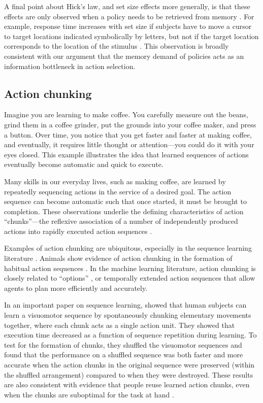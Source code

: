 \documentclass[11pt]{article}
\begin{document}
A final point about Hick's law, and set size effects more generally, is that these effects are only observed when a policy needs to be retrieved from memory \citep{proctor18}. For example, response time increases with set size if subjects have to move a cursor to target locations indicated symbolically by letters, but not if the target location corresponds to the location of the stimulus \citep{dassonville99}. This observation is broadly consistent with our argument that the memory demand of policies acts as an information bottleneck in action selection.

\subsection{Action chunking}

Imagine you are learning to make coffee. You carefully measure out the beans, grind them in a coffee grinder, put the grounds into your coffee maker, and press a button. Over time, you notice that you get faster and faster at making coffee, and eventually, it requires little thought or attention---you could do it with your eyes closed. This example illustrates the idea that learned sequences of actions eventually become automatic and quick to execute.

Many skills in our everyday lives, such as making coffee, are learned by repeatedly sequencing actions in the service of a desired goal. The action sequence can become automatic such that once started, it must be brought to completion. These observations underlie the defining characteristics of action ``chunks''---the reflexive association of a number of independently produced actions into rapidly executed action sequences \citep{dezfouli12,lashley51,sakai03,botvinick08}.

Examples of action chunking are ubiquitous, especially in the sequence learning literature \citep{Terrace1991-di,Verwey1999-fn,sakai03,Miyapuram2006-gb}. Animals show evidence of action chunking in the formation of habitual action sequences \citep{Graybiel1998-sw,jin10,jin14}. In the machine learning literature, action chunking is closely related to ``options'' \citep{Precup1998-wo,Precup2000-qa}, or temporally extended action sequences that allow agents to plan more efficiently and accurately. 

In an important paper on sequence learning, \cite{sakai03} showed that human subjects can learn a visuomotor sequence by spontaneously chunking elementary movements together, where each chunk acts as a single action unit. They showed that execution time decreased as a function of sequence repetition during learning. To test for the formation of chunks, they shuffled the visuomotor sequences and found that the performance on a shuffled sequence was both faster and more accurate when the action chunks in the original sequence were preserved (within the shuffled arrangement) compared to when they were destroyed.  These results are also consistent with evidence that people reuse learned action chunks, even when the chunks are suboptimal for the task at hand \citep{Huys2015-cq}. 
\end{document}
